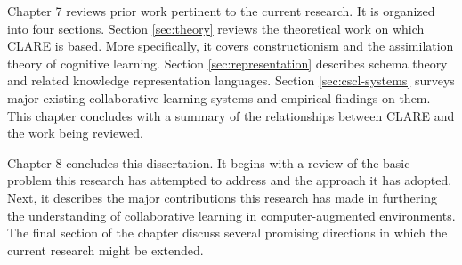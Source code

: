 Chapter 7 reviews prior work pertinent to the current research. It is
organized into four sections. Section \ref{sec:theory} reviews the
theoretical work on which CLARE is based.  More specifically, it covers
constructionism and the assimilation theory of cognitive learning. Section
\ref{sec:representation} describes schema theory and related knowledge
representation languages.  Section \ref{sec:cscl-systems} surveys major
existing collaborative learning systems and empirical findings on them.
This chapter concludes with a summary of the relationships between CLARE
and the work being reviewed.

Chapter 8 concludes this dissertation. It begins with a review of the basic
problem this research has attempted to address and the approach it has
adopted. Next, it describes the major contributions this research has made
in furthering the understanding of collaborative learning in
computer-augmented environments. The final section of the chapter discuss
several promising directions in which the current research might be
extended.




